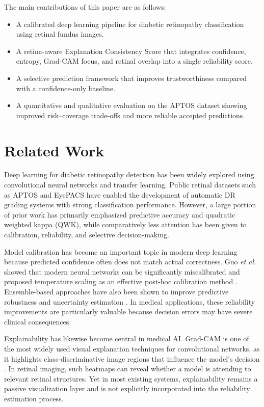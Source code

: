 \documentclass[conference]{IEEEtran}
\begin{document}
The main contributions of this paper are as follows:
\begin{itemize}
    \item A calibrated deep learning pipeline for diabetic retinopathy classification using retinal fundus images.
    \item A retina-aware Explanation Consistency Score that integrates confidence, entropy, Grad-CAM focus, and retinal overlap into a single reliability score.
    \item A selective prediction framework that improves trustworthiness compared with a confidence-only baseline.
    \item A quantitative and qualitative evaluation on the APTOS dataset showing improved risk--coverage trade-offs and more reliable accepted predictions.
\end{itemize}

\section{Related Work}
Deep learning for diabetic retinopathy detection has been widely explored using convolutional neural networks and transfer learning. Public retinal datasets such as APTOS and EyePACS have enabled the development of automatic DR grading systems with strong classification performance. However, a large portion of prior work has primarily emphasized predictive accuracy and quadratic weighted kappa (QWK), while comparatively less attention has been given to calibration, reliability, and selective decision-making.

Model calibration has become an important topic in modern deep learning because predicted confidence often does not match actual correctness. Guo \textit{et al.} showed that modern neural networks can be significantly miscalibrated and proposed temperature scaling as an effective post-hoc calibration method \cite{guo2017calibration}. Ensemble-based approaches have also been shown to improve predictive robustness and uncertainty estimation \cite{lakshminarayanan2017ensembles}. In medical applications, these reliability improvements are particularly valuable because decision errors may have severe clinical consequences.

Explainability has likewise become central in medical AI. Grad-CAM is one of the most widely used visual explanation techniques for convolutional networks, as it highlights class-discriminative image regions that influence the model’s decision \cite{gradcam}. In retinal imaging, such heatmaps can reveal whether a model is attending to relevant retinal structures. Yet in most existing systems, explainability remains a passive visualization layer and is not explicitly incorporated into the reliability estimation process.
\end{document}
